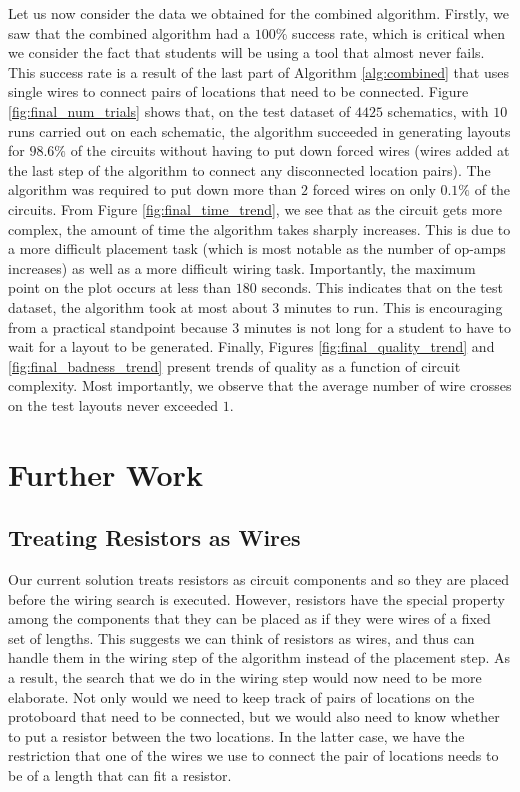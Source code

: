 Let us now consider the data we obtained for the combined algorithm. Firstly, we
saw that the combined algorithm had a $100\%$ success rate, which is critical
when we consider the fact that students will be using a tool that almost never
fails. This success rate is a result of the last part of Algorithm
\ref{alg:combined} that uses single wires to connect pairs of locations that
need to be connected.
Figure \ref{fig:final_num_trials} shows that, on the test dataset of $4425$
schematics, with $10$ runs carried out on each schematic, the algorithm succeeded
in generating layouts for $98.6\%$ of the circuits without having to put down
forced wires (wires added at the last step of the algorithm to connect any
disconnected location pairs). The algorithm was
required to put down more than $2$ forced wires on only $0.1\%$ of the circuits.
From Figure
\ref{fig:final_time_trend}, we see that as the circuit gets more complex, the
amount of time the algorithm takes sharply increases. This is due to a more
difficult placement task (which is most notable as the number of op-amps
increases) as well as a more
difficult wiring task. Importantly, the maximum
point on the plot occurs at less than $180$ seconds. This indicates that on the
test dataset, the algorithm took at most about $3$ minutes to run. This is
encouraging from a practical standpoint because $3$ minutes is not long
for a student to have to wait for a layout to be generated.
Finally, Figures \ref{fig:final_quality_trend} and \ref{fig:final_badness_trend}
present trends of quality as a
function of circuit complexity. Most importantly, we observe that the average
number of wire crosses on the test layouts never exceeded $1$.

\section{Further Work}

\subsection{Treating Resistors as Wires}

Our current solution treats resistors as circuit components and so they are
placed before the wiring search is executed.
However, resistors have the special property among the components that
they can be placed as if they were wires of a fixed set of lengths.
This suggests we can think of resistors as wires,
and thus can handle them in the wiring step of the algorithm instead of
the placement step. As a result, the search that we do in the wiring step would
now need to be
more elaborate. Not only would we need to keep track of pairs of locations on the
protoboard that need to be connected, but we would also need to know whether to
put a resistor between the two locations. In the latter case, we have the
restriction that one of the wires we use to connect the pair of locations needs
to be of a length that can fit a resistor.


